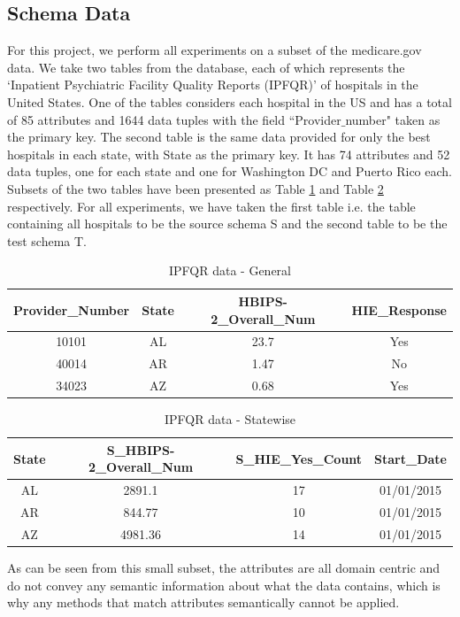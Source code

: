 \documentclass[conference]{IEEEtran}
\begin{document}
\subsection{Schema Data}
For this project, we perform all experiments on a subset of the medicare.gov data. We take two tables from the database, each of which represents the ‘Inpatient Psychiatric Facility Quality Reports (IPFQR)’ of hospitals in the United States. One of the tables considers each hospital in the US and has a total of 85 attributes and 1644 data tuples with the field ``Provider$\_$number" taken as the primary key. The second table is the same data provided for only the best hospitals in each state, with State as the primary key. It has 74 attributes and 52 data tuples, one for each state and one for Washington DC and Puerto Rico each. Subsets of the two tables have been presented as Table \ref{HP-main} and Table \ref{SP-main} respectively. For all experiments, we have taken the first table i.e. the table containing all hospitals to be the source schema S and the second table to be the test schema T.

\begin{table}[h]
\centering
\caption{IPFQR data - General}
\begin{tabular}{|c|c|c|c|}
\hline
Provider\_Number & State & HBIPS-2\_Overall\_Num & HIE\_Response\\
\hline \hline
10101 & AL & 23.7 & Yes\\
40014 & AR & 1.47 & No\\
34023 & AZ & 0.68 & Yes\\
\hline
\end{tabular}
\label{HP-main}
\end{table}

\begin{table}[h]
\centering
\caption{IPFQR data - Statewise}
\begin{tabular}{|c|c|c|c|}
\hline
State & S\_HBIPS-2\_Overall\_Num & S\_HIE\_Yes\_Count & Start\_Date\\
\hline \hline
AL & 2891.1 & 17 & 01/01/2015\\
AR & 844.77 & 10 & 01/01/2015\\
AZ & 4981.36 & 14 & 01/01/2015\\
\hline
\end{tabular}
\label{SP-main}
\end{table}

As can be seen from this small subset, the attributes are all domain centric and do not convey any semantic information about what the data contains, which is why any methods that match attributes semantically cannot be applied. 
\end{document}
